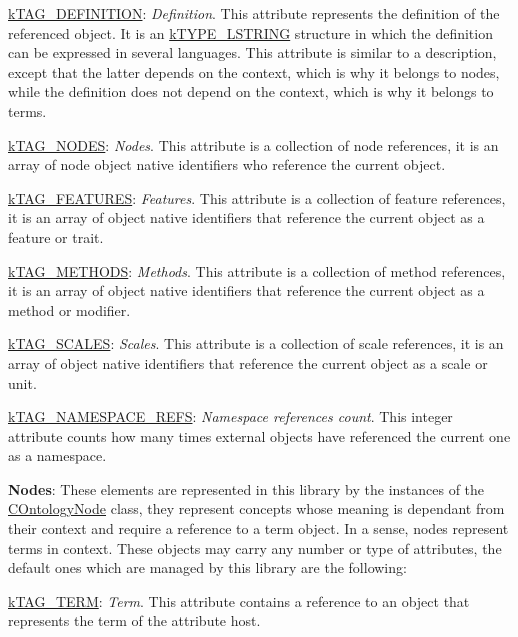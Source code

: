 {\begin{DoxyItemize}
\begin{DoxyItemize}
\item {\ttfamily \hyperlink{}{k\-T\-A\-G\-\_\-\-D\-E\-F\-I\-N\-I\-T\-I\-O\-N}}\-: {\itshape Definition}. This attribute represents the definition of the referenced object. It is an \hyperlink{}{k\-T\-Y\-P\-E\-\_\-\-L\-S\-T\-R\-I\-N\-G} structure in which the definition can be expressed in several languages. This attribute is similar to a description, except that the latter depends on the context, which is why it belongs to nodes, while the definition does not depend on the context, which is why it belongs to terms. 
\item {\ttfamily \hyperlink{}{k\-T\-A\-G\-\_\-\-N\-O\-D\-E\-S}}\-: {\itshape Nodes}. This attribute is a collection of node references, it is an array of node object native identifiers who reference the current object. 
\item {\ttfamily \hyperlink{}{k\-T\-A\-G\-\_\-\-F\-E\-A\-T\-U\-R\-E\-S}}\-: {\itshape Features}. This attribute is a collection of feature references, it is an array of object native identifiers that reference the current object as a feature or trait. 
\item {\ttfamily \hyperlink{}{k\-T\-A\-G\-\_\-\-M\-E\-T\-H\-O\-D\-S}}\-: {\itshape Methods}. This attribute is a collection of method references, it is an array of object native identifiers that reference the current object as a method or modifier. 
\item {\ttfamily \hyperlink{}{k\-T\-A\-G\-\_\-\-S\-C\-A\-L\-E\-S}}\-: {\itshape Scales}. This attribute is a collection of scale references, it is an array of object native identifiers that reference the current object as a scale or unit. 
\item {\ttfamily \hyperlink{}{k\-T\-A\-G\-\_\-\-N\-A\-M\-E\-S\-P\-A\-C\-E\-\_\-\-R\-E\-F\-S}}\-: {\itshape Namespace references count}. This integer attribute counts how many times external objects have referenced the current one as a namespace. 
\end{DoxyItemize}
\item {\bfseries Nodes}\-: These elements are represented in this library by the instances of the \hyperlink{class_c_ontology_node}{C\-Ontology\-Node} class, they represent concepts whose meaning is dependant from their context and require a reference to a term object. In a sense, nodes represent terms in context. These objects may carry any number or type of attributes, the default ones which are managed by this library are the following\-: 
\begin{DoxyItemize}
\item {\ttfamily \hyperlink{}{k\-T\-A\-G\-\_\-\-T\-E\-R\-M}}\-: {\itshape Term}. This attribute contains a reference to an object that represents the term of the attribute host. 

\end{DoxyItemize}
\end{DoxyItemize}}
